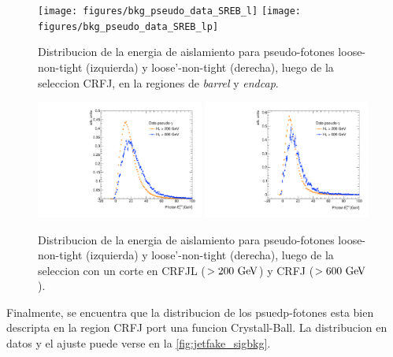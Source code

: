 \begin{figure}[!htbp]
  \centering

  \texttt{[image: figures/bkg\_pseudo\_data\_SREB\_l]}
  \texttt{[image: figures/bkg\_pseudo\_data\_SREB\_lp]}

  \caption{Distribucion de la energia de aislamiento para pseudo-fotones loose-non-tight (izquierda) y loose'-non-tight (derecha),
    luego de la seleccion CRFJ, en la regiones de \emph{barrel} y \emph{endcap}.}
  \label{fig:jetfake_pseudo_data_BE}

\end{figure}

\begin{figure}[!htbp]
  \centering

  \includegraphics[width=0.49\textwidth]{figures/bkg_pseudo_data_SR_VR_l}
  \includegraphics[width=0.49\textwidth]{figures/bkg_pseudo_data_SR_VR_lp}

  \caption{Distribucion de la energia de aislamiento para pseudo-fotones loose-non-tight (izquierda) y loose'-non-tight (derecha),
    luego de la seleccion con un corte en {\HT} CRFJL ($>200 \gev$) y CRFJ ($>600 \gev$).}
  \label{fig:jetfake_pseudo_data_LR_VR}

\end{figure}

Finalmente, se encuentra que la distribucion de los psuedp-fotones esta bien descripta en la region CRFJ port una funcion
Crystall-Ball. La distribucion en datos y el ajuste puede verse en la \cref{fig:jetfake_sigbkg}.


